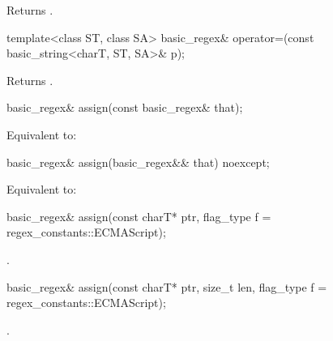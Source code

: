 \begin{itemdescr}
\pnum
\effects Returns .
\end{itemdescr}

%
\begin{itemdecl}
template<class ST, class SA>
  basic_regex& operator=(const basic_string<charT, ST, SA>& p);
\end{itemdecl}

\begin{itemdescr}
\pnum
\effects Returns .
\end{itemdescr}

%
\begin{itemdecl}
basic_regex& assign(const basic_regex& that);
\end{itemdecl}

\begin{itemdescr}
\pnum
\effects Equivalent to: 
\end{itemdescr}

%
\begin{itemdecl}
basic_regex& assign(basic_regex&& that) noexcept;
\end{itemdecl}

\begin{itemdescr}
\pnum
\effects Equivalent to: 
\end{itemdescr}

%
\begin{itemdecl}
basic_regex& assign(const charT* ptr, flag_type f = regex_constants::ECMAScript);
\end{itemdecl}

\begin{itemdescr}
\pnum
\returns {}.
\end{itemdescr}

%
\begin{itemdecl}
basic_regex& assign(const charT* ptr, size_t len, flag_type f = regex_constants::ECMAScript);
\end{itemdecl}

\begin{itemdescr}
\pnum
\returns {}.
\end{itemdescr}

